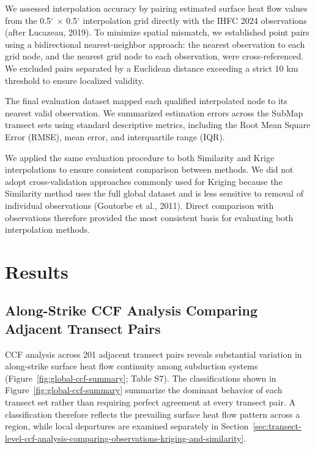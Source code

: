 \documentclass[draft,linenumbers]{agujournal2019}
\begin{document}
We assessed interpolation accuracy by pairing estimated surface heat
flow values from the 0.5\(^\circ\) \(\times\) 0.5\(^\circ\)
interpolation grid directly with the IHFC 2024 observations (after
Lucazeau, 2019). To minimize spatial mismatch, we established point
pairs using a bidirectional nearest-neighbor approach: the nearest
observation to each grid node, and the nearest grid node to each
observation, were cross-referenced. We excluded pairs separated by a
Euclidean distance exceeding a strict 10 km threshold to ensure
localized validity.

The final evaluation dataset mapped each qualified interpolated node to
its nearest valid observation. We summarized estimation errors across
the SubMap transect sets using standard descriptive metrics, including
the Root Mean Square Error (RMSE), mean error, and interquartile range
(IQR).

We applied the same evaluation procedure to both Similarity and Krige
interpolations to ensure consistent comparison between methods. We did
not adopt cross-validation approaches commonly used for Kriging because
the Similarity method uses the full global dataset and is less sensitive
to removal of individual observations (Goutorbe et al., 2011). Direct
comparison with observations therefore provided the most consistent
basis for evaluating both interpolation methods.

\section{Results}\label{sec:results}

\subsection{Along-Strike CCF Analysis Comparing Adjacent Transect
Pairs}\label{sec:along-strike-ccf-analysis-comparing-adjacent-transect-pairs}

CCF analysis across 201 adjacent transect pairs reveals substantial
variation in along-strike surface heat flow continuity among subduction
systems (Figure~\ref{fig:global-ccf-summary}; Table S7). The
classifications shown in Figure~\ref{fig:global-ccf-summary} summarize
the dominant behavior of each transect set rather than requiring perfect
agreement at every transect pair. A classification therefore reflects
the prevailing surface heat flow pattern across a region, while local
departures are examined separately in
Section~\ref{sec:transect-level-ccf-analysis-comparing-observations-kriging-and-similarity}.
\end{document}
